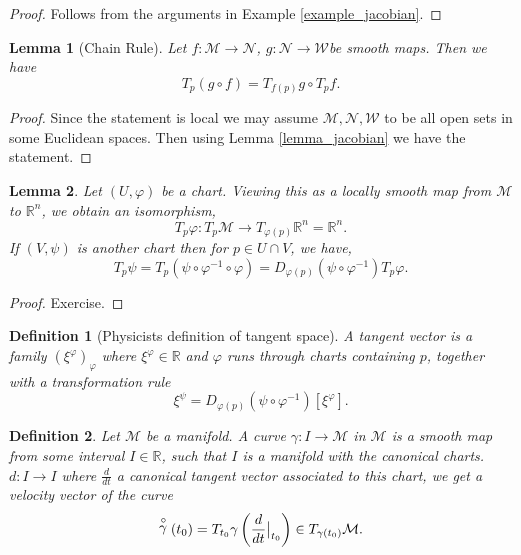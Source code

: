 \documentclass[10pt]{article}
\newtheorem{definition}{Definition}[section]
\newtheorem{lemma}{Lemma}[section]
\newcommand{\R}[0]{\mathbb{R}}
\newcommand{\M}[0]{\mathcal{M}}
\newcommand{\maniN}[0]{\mathcal{N}}
\begin{document}
\begin{proof}
  Follows from the arguments in Example \ref{example_jacobian}.
\end{proof}
\begin{lemma}[Chain Rule]
  Let $f:\M\to\mathcal{N}$, $g:\mathcal{N}\to\mathcal{W} $be smooth maps. Then we have 
  \begin{equation*}
    T_p(g\circ f) = T_{f(p)}g\circ T_pf.
  \end{equation*}
\end{lemma}
\begin{proof}
  Since the statement is local we may assume $\M,\maniN,\mathcal{W}$ to be all open sets in some Euclidean spaces. Then using Lemma \ref{lemma_jacobian} we have the statement.
\end{proof}
\begin{lemma}
  Let $(U,\varphi)$ be a chart. Viewing this as a locally smooth map from $\M$ to $\R^n$, we obtain an isomorphism,
  \begin{equation*}
    T_p\varphi:T_p\M\to T_{\varphi(p)}\R^n = \R^n.
  \end{equation*}
  If $(V,\psi)$ is another chart then for $p\in U\cap V$, we have,
  \begin{equation*}
    T_p\psi = T_p(\psi\circ\varphi^{-1}\circ \varphi) = D_{\varphi(p)}(\psi\circ\varphi^{-1})T_p\varphi.
  \end{equation*}
\end{lemma}
\begin{proof}
  Exercise.
\end{proof}

\begin{definition}[Physicists definition of tangent space]
  A tangent vector is a family $(\xi^\varphi)_\varphi$ where $\xi^\varphi\in\R$ 
  and $\varphi$ runs through charts containing $p$, together with a transformation rule 
  \begin{equation*}
    \xi^\psi = D_{\varphi(p)}\left(\psi\circ\varphi^{-1}\right)[\xi^\varphi].
  \end{equation*}

\end{definition}

\begin{definition}
  Let $\M$ be a manifold. A curve $\gamma:I\to \M$ in $\M$ is a smooth map from some interval $I\in\R$, such that $I$ is a manifold with the canonical charts. $d:I\to I$ where ${\frac d {dt}}$ a canonical tangent vector associated to this chart, we get a velocity vector of the curve 
  \begin{equation*}
    \stackrel{\circ}{\gamma}(t_0) = T_{t_0}\gamma\left({\frac d {dt}}\big{|}_{t_0}\right)\in T_{\gamma(t_0)}\M.
  \end{equation*}
\end{definition}
\end{document}
